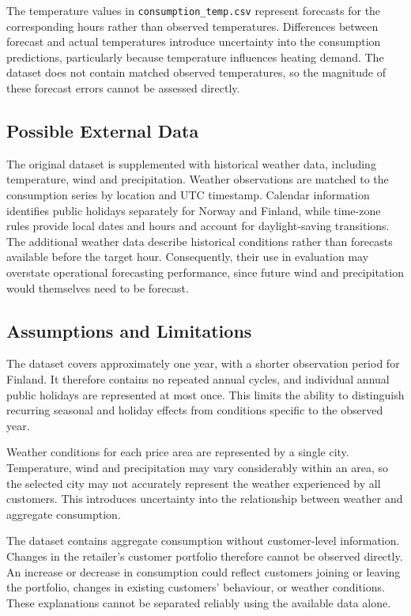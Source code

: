 \documentclass[11pt,a4paper]{article}
\begin{document}
The temperature values in \texttt{consumption\_temp.csv} represent forecasts for the corresponding hours rather than observed temperatures. Differences between forecast and actual temperatures introduce uncertainty into the consumption predictions, particularly because temperature influences heating demand. The dataset does not contain matched observed temperatures, so the magnitude of these forecast errors cannot be assessed directly.

\subsection{Possible External Data}
The original dataset is supplemented with historical weather data, including temperature, wind and precipitation. Weather observations are matched to the consumption series by location and UTC timestamp. Calendar information identifies public holidays separately for Norway and Finland, while time-zone rules provide local dates and hours and account for daylight-saving transitions. The additional weather data describe historical conditions rather than forecasts available before the target hour. Consequently, their use in evaluation may overstate operational forecasting performance, since future wind and precipitation would themselves need to be forecast.

\subsection{Assumptions and Limitations}
\label{sec:data-limitations}
The dataset covers approximately one year, with a shorter observation period for Finland. It therefore contains no repeated annual cycles, and individual annual public holidays are represented at most once. This limits the ability to distinguish recurring seasonal and holiday effects from conditions specific to the observed year.

Weather conditions for each price area are represented by a single city. Temperature, wind and precipitation may vary considerably within an area, so the selected city may not accurately represent the weather experienced by all customers. This introduces uncertainty into the relationship between weather and aggregate consumption.

The dataset contains aggregate consumption without customer-level information. Changes in the retailer's customer portfolio therefore cannot be observed directly. An increase or decrease in consumption could reflect customers joining or leaving the portfolio, changes in existing customers' behaviour, or weather conditions. These explanations cannot be separated reliably using the available data alone.
\end{document}
